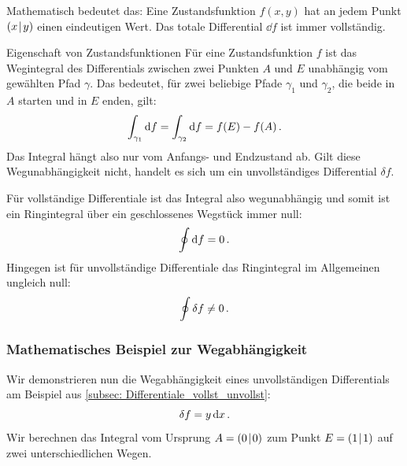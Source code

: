 Mathematisch bedeutet das: Eine Zustandsfunktion $f(x,y)$ hat an jedem Punkt $(x\!\mid\! y)$ einen eindeutigen Wert. Das totale Differential $\dd f$ ist immer vollständig.

\begin{importantbox}{Eigenschaft von Zustandsfunktionen}
    Für eine Zustandsfunktion $f$ ist das Wegintegral des Differentials zwischen zwei Punkten $A$ und $E$ unabhängig vom gewählten Pfad $\gamma$. Das bedeutet, für zwei beliebige Pfade $\gamma_1$ und $\gamma_2$, die beide in $A$ starten und in $E$ enden, gilt:
    \begin{equation}\label{eq: weg_unabhaengigkeit}
        \int_{\gamma_{1}} \mathrm{d} f = \int_{\gamma_{2}} \mathrm{d} f = f(E) - f(A) \,.
    \end{equation}
    Das Integral hängt also nur vom Anfangs- und Endzustand ab. Gilt diese Wegunabhängigkeit nicht, handelt es sich um ein unvollständiges Differential $\delta f$.
\end{importantbox}
Für vollständige Differentiale ist das Integral also wegunabhängig und somit ist ein Ringintegral über ein geschlossenes Wegstück immer null:
\begin{equation}\label{eq: ringintegral_null}
    \oint \mathrm{d} f = 0 \,.
\end{equation}
Hingegen ist für unvollständige Differentiale das Ringintegral im Allgemeinen ungleich null:
\begin{equation}\label{eq: ringintegral_nicht_null}
    \oint \delta f \neq 0 \,.
\end{equation}

\subsubsection{Mathematisches Beispiel zur Wegabhängigkeit}\label{subsubsec: bsp_wegabhaengigkeit}
Wir demonstrieren nun die Wegabhängigkeit eines unvollständigen Differentials am Beispiel aus \cref{subsec: Differentiale_vollst_unvollst}:
\begin{equation*}
    \delta f = y \, \mathrm{d} x \,.
\end{equation*}
Wir berechnen das Integral vom Ursprung $A = (0\!\mid\! 0)$ zum Punkt $E = (1\!\mid\! 1)$ auf zwei unterschiedlichen Wegen.

